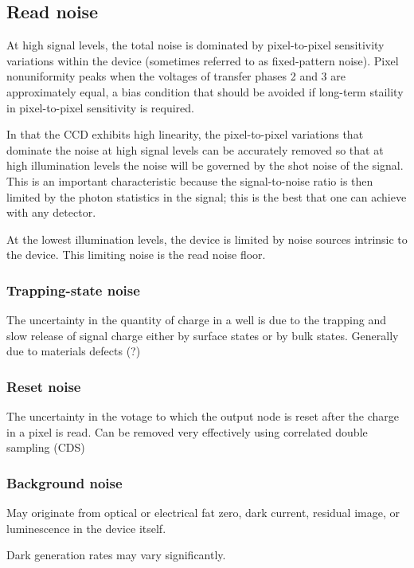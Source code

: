 \documentclass[10pt,fleqn]{article}
\begin{document}
{\subsection{Read noise}
At high signal levels, the total noise is dominated by pixel-to-pixel sensitivity variations within the device (sometimes referred to as fixed-pattern noise). Pixel nonuniformity peaks when the voltages of transfer phases 2 and 3 are approximately equal, a bias condition that should be avoided if long-term staility in pixel-to-pixel sensitivity is required.

In that the CCD exhibits high linearity, the pixel-to-pixel variations that dominate the noise at high signal levels can be accurately removed so that at high illumination levels the noise will be governed by the shot noise of the signal. This is an important characteristic because the signal-to-noise ratio is then limited by the photon statistics in the signal; this is the best that one can achieve with any detector.

At the lowest illumination levels, the device is limited by noise sources intrinsic to the device. This limiting noise is the read noise floor.

\subsubsection{Trapping-state noise}

The uncertainty in the quantity of charge in a well is due to the trapping and slow release of signal charge either by surface states or by bulk states. Generally due to materials defects (?)

\subsubsection{Reset noise}

The uncertainty in the votage to which the output node is reset after the charge in a pixel is read. Can be removed very effectively using correlated double sampling (CDS) 

\subsubsection{Background noise}

May originate from optical or electrical fat zero, dark current, residual image, or luminescence in the device itself.

Dark generation rates may vary significantly.

}
\end{document}
